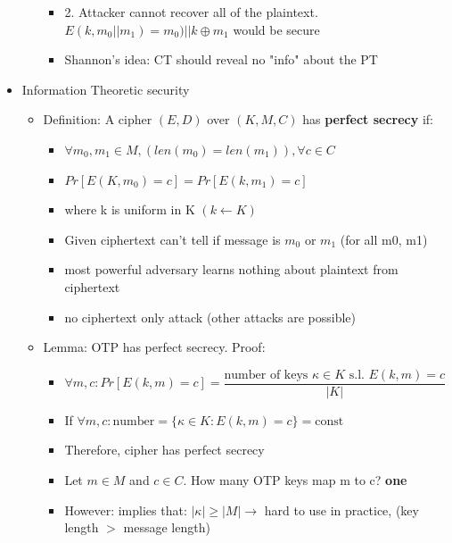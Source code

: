 \documentclass[]{article}
\begin{document}
\begin{itemize}
\begin{itemize}
\begin{itemize}
			\item 2. Attacker cannot recover all of the plaintext. $E(k, m_{0} || m_{1}) = m_{0}) || k \oplus m_{1}$ would be secure
			\item Shannon's idea: CT should reveal no "info" about the PT
		\end{itemize}
	\end{itemize}
	\item Information Theoretic security
	\begin{itemize}
		\item Definition: A cipher $(E,D)$ over $(K, M, C)$ has \textbf{perfect secrecy} if:
		\begin{itemize}
			\item $\forall m_{0}, m_{1} \in M, (len(m_{0}) = len(m_{1})), \forall c \in C$
			\item $Pr[E(K, m_{0}) = c] = Pr[E(k, m_{1}) = c]$
			\item where k is uniform in K $(k \leftarrow K)$
			\item Given ciphertext can't tell if message is $m_{0}$ or $m_{1}$ (for all m0, m1)
			\item most powerful adversary learns nothing about plaintext from ciphertext
			\item no ciphertext only attack (other attacks are possible)
		\end{itemize}
		\item Lemma: OTP has perfect secrecy. Proof: 
		\begin{itemize}
			\item $\forall m,c: Pr[E(k,m)=c] = \dfrac{\text{number of keys } \kappa \in K \text{ s.l. } E(k,m)=c}{|K|} $
			\item If $\forall m,c: \text{number} = \{\kappa \in K: E(k,m)=c \} = \text{const}$
			\item Therefore, cipher has perfect secrecy
			\item Let $m \in M $ and $c \in C$. How many OTP keys map m to c? \textbf{one}
			\item However: implies that: $|\kappa| \geq |M| \rightarrow $ hard to use in practice, (key length $>$ message length)
		\end{itemize}
	\end{itemize}
\end{itemize}
\end{document}
